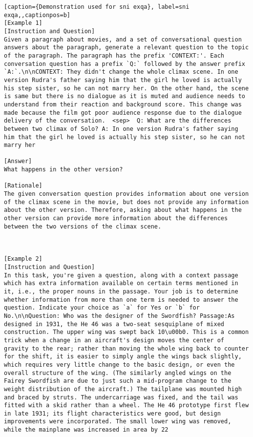 \begin{lstlisting}[caption={Demonstration used for sni exqa}, label=sni exqa,,captionpos=b]
[Example 1]
[Instruction and Question]
Given a paragraph about movies, and a set of conversational question answers about the paragraph, generate a relevant question to the topic of the paragraph. The paragraph has the prefix 'CONTEXT:'. Each conversation question has a prefix `Q:` followed by the answer prefix `A:`.\n\nCONTEXT: They didn't change the whole climax scene. In one version Rudra's father saying him that the girl he loved is actually his step sister, so he can not marry her. On the other hand, the scene is same but there is no dialogue as it is muted and audience needs to understand from their reaction and background score. This change was made because the film got poor audience response due to the dialogue delivery of the conversation.  <sep>  Q: What are the differences between two climax of Solo? A: In one version Rudra's father saying him that the girl he loved is actually his step sister, so he can not marry her

[Answer]
What happens in the other version?

[Rationale]
The given conversation question provides information about one version of the climax scene in the movie, but does not provide any information about the other version. Therefore, asking about what happens in the other version can provide more information about the differences between the two versions of the climax scene.



[Example 2]
[Instruction and Question]
In this task, you're given a question, along with a context passage which has extra information available on certain terms mentioned in it, i.e., the proper nouns in the passage. Your job is to determine whether information from more than one term is needed to answer the question. Indicate your choice as `a` for Yes or `b` for No.\n\nQuestion: Who was the designer of the Swordfish? Passage:As designed in 1931, the He 46 was a two-seat sesquiplane of mixed construction. The upper wing was swept back 10\u00b0. This is a common trick when a change in an aircraft's design moves the center of gravity to the rear; rather than moving the whole wing back to counter for the shift, it is easier to simply angle the wings back slightly, which requires very little change to the basic design, or even the overall structure of the wing. (The similarly angled wings on the Fairey Swordfish are due to just such a mid-program change to the weight distribution of the aircraft.) The tailplane was mounted high and braced by struts. The undercarriage was fixed, and the tail was fitted with a skid rather than a wheel. The He 46 prototype first flew in late 1931; its flight characteristics were good, but design improvements were incorporated. The small lower wing was removed, while the mainplane was increased in area by 22


\end{lstlisting}

